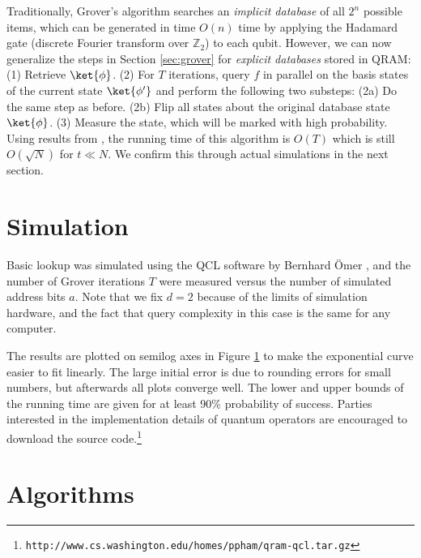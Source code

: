 \documentclass{toc}
\theoremstyle{plain}
\theoremstyle{definition}
\begin{document}
%
Traditionally, Grover's algorithm searches an \textit{implicit database}
of all $2^n$ possible items,
which can be generated in time $O(n)$ time by applying the Hadamard gate
(discrete Fourier transform over $\mathbb{Z}_2$) to each qubit. However,
we can now generalize the steps in Section \ref{sec:grover} for
\textit{explicit databases} stored in QRAM:
(1) Retrieve $\ket{\phi}$.
(2) For $T$ iterations, query $f$ in parallel on the basis
   states of the current state $\ket{\phi'}$ and perform the following two
   substeps:
(2a) Do the same step as before.
(2b) Flip all states about the original database state $\ket{\phi}$.
(3) Measure the state, which will be marked with high probability.
Using results from \cite{bbbgl98}, the running time of this algorithm
is $O(T)$ which is still $O(\sqrt{N})$ for $t \ll N$. We confirm this
through actual simulations in the next section.

\section{Simulation}
\label{sec:sim}

Basic lookup was simulated using the QCL software by Bernhard
\"Omer \cite{oemer00}, and the number of Grover iterations $T$
were measured versus the number of simulated address bits $a$.
Note that we fix $d=2$
because of the limits of simulation hardware, and the fact that query
complexity in this case is the same for any computer.

The results are plotted on semilog axes in Figure \ref{qsim:fig} to make the
exponential curve easier to fit linearly. The large initial error is
due to rounding errors for small numbers, but afterwards all plots 
converge well.
The lower and upper bounds of the running time are given for at
least 90\% probability of success. Parties interested in the
implementation details of quantum operators are encouraged to download
the source code.\footnote{\texttt{http://www.cs.washington.edu/homes/ppham/qram-qcl.tar.gz}}

\begin{figure}[hpt!]
\begin{center}

\end{center}
\label{qsim:fig}
\caption{}
\end{figure}

\section{Algorithms}
\label{sec:algs}
\end{document}
